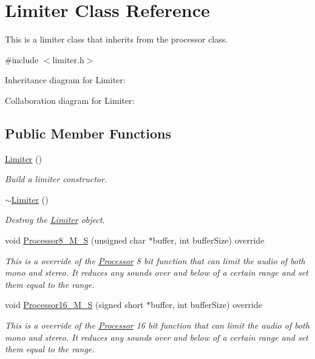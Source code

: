 \hypertarget{classLimiter}{}\section{Limiter Class Reference}
\label{classLimiter}


This is a limiter class that inherits from the processor class.  




{\ttfamily \#include $<$limiter.\+h$>$}



Inheritance diagram for Limiter\+:


Collaboration diagram for Limiter\+:
\subsection*{Public Member Functions}
\begin{DoxyCompactItemize}
\item 
\mbox{\label{classLimiter_aeb9287deaa87e9a6ad9658990cde09fe}} 
\hyperlink{classLimiter_aeb9287deaa87e9a6ad9658990cde09fe}{Limiter} ()
\begin{DoxyCompactList}\small\item\em Build a limiter constructor. \end{DoxyCompactList}\item 
\mbox{\label{classLimiter_a29b205ac461e886d81eee0cf5454e27a}} 
\hyperlink{classLimiter_a29b205ac461e886d81eee0cf5454e27a}{$\sim$\+Limiter} ()
\begin{DoxyCompactList}\small\item\em Destroy the \hyperlink{classLimiter}{Limiter} object. \end{DoxyCompactList}\item 
void \hyperlink{classLimiter_acc021d4c3af04a48b8af7bb8853ce654}{Processor8\+\_\+\+M\+\_\+S} (unsigned char $\ast$buffer, int buffer\+Size) override
\begin{DoxyCompactList}\small\item\em This is a override of the \hyperlink{classProcessor}{Processor} 8 bit function that can limit the audio of both mono and stereo. It reduces any sounds over and below of a certain range and set them equal to the range. \end{DoxyCompactList}\item 
void \hyperlink{classLimiter_ab81f92ad3d76078c424c2f4a8f518ba9}{Processor16\+\_\+\+M\+\_\+S} (signed short $\ast$buffer, int buffer\+Size) override
\begin{DoxyCompactList}\small\item\em This is a override of the \hyperlink{classProcessor}{Processor} 16 bit function that can limit the audio of both mono and stereo. It reduces any sounds over and below of a certain range and set them equal to the range. \end{DoxyCompactList}\end{DoxyCompactItemize}



